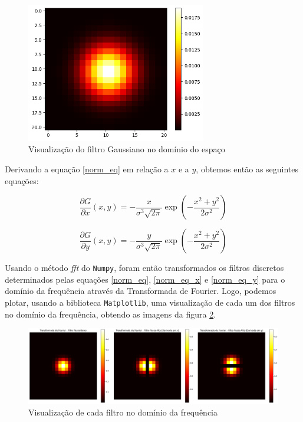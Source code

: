 \documentclass[a4paper, 11pt]{article}
\begin{document}
\begin{figure}[H]
    \centering 
    \includegraphics[width=0.7\textwidth]{imgs/norm_esp.png}
    \caption{Visualização do filtro Gaussiano no domínio do espaço}
    \label{fig:norm_esp} 
\end{figure}

Derivando a equação \ref{norm_eq} em relação a $x$ e a $y$, obtemos então as seguintes equações:

\begin{equation}
    \frac{\partial G}{\partial x}(x,y) = -\frac{x}{\sigma^3 \sqrt{2\pi}} \exp\left(-\frac{x^2 + y^2}{2\sigma^2}\right)
    \label{norm_eq_x}
\end{equation}

\begin{equation}
    \frac{\partial G}{\partial y}(x,y) = -\frac{y}{\sigma^3 \sqrt{2\pi}} \exp\left(-\frac{x^2 + y^2}{2\sigma^2}\right)
    \label{norm_eq_y}
\end{equation}

Usando o método \textit{fft} do \texttt{Numpy}, foram então transformados os filtros discretos determinados pelas equações \ref{norm_eq}, \ref{norm_eq_x} e \ref{norm_eq_y} para o domínio da frequência através da Transformada de Fourier. Logo, podemos plotar, usando a biblioteca \texttt{Matplotlib}, uma visualização de cada um dos filtros no domínio da frequência, obtendo as imagens da figura \ref{fig:fil_freq}.

\begin{figure}[H]
    \centering 
    \includegraphics[width=1\textwidth]{imgs/filt_four.png}
    \caption{Visualização de cada filtro no domínio da frequência}
    \label{fig:fil_freq} 
\end{figure}
\end{document}
